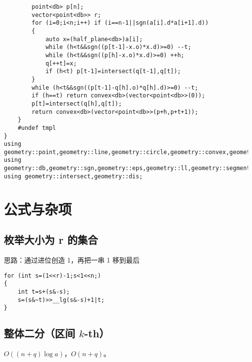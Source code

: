 \documentclass{ctexart}
\begin{document}
\begin{lstlisting}
		point<db> p[n];
		vector<point<db>> r;
		for (i=0;i<n;i++) if (i==n-1||sgn(a[i].d*a[i+1].d))
		{
			auto x=(half_plane<db>)a[i];
			while (h<t&&sgn((p[t-1]-x.o)*x.d)>=0) --t;
			while (h<t&&sgn((p[h]-x.o)*x.d)>=0) ++h;
			q[++t]=x;
			if (h<t) p[t-1]=intersect(q[t-1],q[t]);
		}
		while (h<t&&sgn((p[t-1]-q[h].o)*q[h].d)>=0) --t;
		if (h==t) return convex<db>(vector<point<db>>(0));
		p[t]=intersect(q[h],q[t]);
		return convex<db>(vector<point<db>>(p+h,p+t+1));
	}
	#undef tmpl
}
using geometry::point,geometry::line,geometry::circle,geometry::convex,geometry::half_plane;
using geometry::db,geometry::sgn,geometry::eps,geometry::ll,geometry::segment;
using geometry::intersect,geometry::dis;
\end{lstlisting}


\newpage

\section{公式与杂项}

\subsection{枚举大小为 r 的集合}

思路：通过进位创造 1，再把一串 1 移到最后

\begin{lstlisting}
for (int s=(1<<r)-1;s<1<<n;)
{
	int t=s+(s&-s);
	s=(s&~t)>>__lg(s&-s)+1|t;
}
\end{lstlisting}

\subsection{整体二分（区间 $k$-th）}

$O((n+q)\log a)$，$O(n+q)$。
\end{document}
